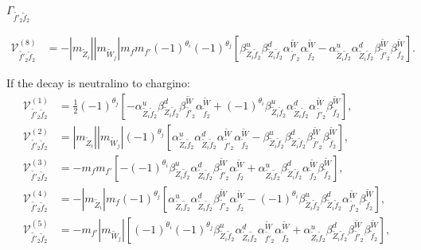 \documentclass[final,3p,times]{elsarticle}
\begin{document}
\textbf{\underline{$\Gamma_{\tilde{f'}_2 \tilde{f}_2}$}}


\begin{align}
\mathcal{V}_{\tilde{f'}_2 \tilde{f}_2}^{(8)} &= -|m_{\tilde{Z}_i}||m_{\tilde{W}_j}|m_{f} m_{f'} (-1)^{\theta_i} (-1)^{\theta_j} \left[\beta_{\tilde{Z}_i \tilde{f}_2}^{u}\beta_{\tilde{Z}_i \tilde{f}_2}^{d} \alpha_{\tilde{f'}_2}^{\tilde{W}} \alpha_{\tilde{f}_2}^{\tilde{W}} - \alpha_{\tilde{Z}_i \tilde{f}_2}^{u} \alpha_{\tilde{Z}_i \tilde{f}_2}^{d} \beta_{\tilde{f'}_2}^{\tilde{W}} \beta_{\tilde{f}_2}^{\tilde{W}}\right].
\end{align}

If the decay is neutralino to chargino:
\begin{align}
\mathcal{V}_{\tilde{f'}_2 \tilde{f}_2}^{(1)} &= \frac{1}{2}(-1)^{\theta_j}\left[-\alpha_{\tilde{Z}_i \tilde{f}_2}^{u} \beta_{\tilde{Z}_i \tilde{f}_2}^{d} \beta_{\tilde{f'}_2}^{\tilde{W}}\alpha_{\tilde{f}_2}^{\tilde{W}} + (-1)^{\theta_i}\beta_{\tilde{Z}_i \tilde{f}_2}^{u} \alpha_{\tilde{Z}_i \tilde{f}_2}^{d} \alpha_{\tilde{f'}_2}^{\tilde{W}} \beta_{\tilde{f}_2}^{\tilde{W}}\right], \\
\mathcal{V}_{\tilde{f'}_2 \tilde{f}_2}^{(2)} &= |m_{\tilde{Z}_i}||m_{\tilde{W}_j}|(-1)^{\theta_j}\left[\alpha_{\tilde{Z}_i \tilde{f}_2}^{u} \alpha_{\tilde{Z}_i \tilde{f}_2}^{d} \alpha_{\tilde{f'}_2}^{\tilde{W}} \alpha_{\tilde{f}_2}^{\tilde{W}} - \beta_{\tilde{Z}_i \tilde{f}_2}^{u} \beta_{\tilde{Z}_{i} \tilde{f}_2}^{d} \beta_{\tilde{f'}_2}^{\tilde{W}} \beta_{\tilde{f}_2}^{\tilde{W}}\right], \\
\mathcal{V}_{\tilde{f'}_2 \tilde{f}_2}^{(3)} &= -m_{f}m_{f'}\left[-(-1)^{\theta_i}\beta_{\tilde{Z}_i \tilde{f}_2}^{u} \alpha_{\tilde{Z}_i \tilde{f}_2}^{d} \beta_{\tilde{f'}_2}^{\tilde{W}} \alpha_{\tilde{f}_2}^{\tilde{W}} +  \alpha_{\tilde{Z}_i \tilde{f}_2}^{u} \beta_{\tilde{Z}_i \tilde{f}_2}^{d} \alpha_{\tilde{f}_2}^{\tilde{W}} \beta_{\tilde{f}_2}^{\tilde{W}}\right], \\
\mathcal{V}_{\tilde{f'}_2 \tilde{f}_2}^{(4)} &=-|m_{\tilde{Z}_i}|m_{f}(-1)^{\theta_j}\left[\alpha_{\tilde{Z}_i \tilde{f}_2}^{u} \alpha_{\tilde{Z}_i \tilde{f}_2}^{d} \beta_{\tilde{f'}_2}^{\tilde{W}}\alpha_{\tilde{f}_2}^{\tilde{W}} - (-1)^{\theta_i} \beta_{\tilde{Z}_i \tilde{f}_2}^{u} \beta_{\tilde{Z}_i \tilde{f}_2}^{d} \alpha_{\tilde{f'}_2}^{\tilde{W}} \beta_{\tilde{f}_2}^{\tilde{W}}\right], \\
\mathcal{V}_{\tilde{f'}_2 \tilde{f}_2}^{(5)} &= -m_{f'} |m_{\tilde{W}_j}|\left[(-1)^{\theta_i}(-1)^{\theta_j} \beta_{\tilde{Z}_i \tilde{f}_2}^{u} \alpha_{\tilde{Z}_i \tilde{f}_2}^{d} \alpha_{\tilde{f'}_2}^{\tilde{W}} \alpha_{\tilde{f}_2}^{\tilde{W}} + \alpha_{\tilde{Z}_i \tilde{f}_2}^{u} \beta_{\tilde{Z}_i \tilde{f}_2}^{d} \beta_{\tilde{f'}_2}^{\tilde{W}} \beta_{\tilde{f}_2}^{\tilde{W}}\right], \\

\end{align}
\end{document}
